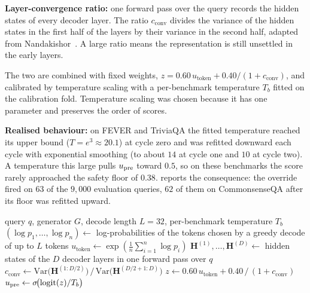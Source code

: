 \textbf{Layer-convergence ratio:} one forward pass over the query records the hidden states of every decoder layer. The ratio $c_{\text{conv}}$ divides the variance of the hidden states in the first half of the layers by their variance in the second half, adapted from Nandakishor~\cite{nandakishor2025routing}. A large ratio means the representation is still unsettled in the early layers.

The two are combined with fixed weights, $z = 0.60\,u_{\text{token}} + 0.40/(1+c_{\text{conv}})$, and calibrated by temperature scaling \cite{pmlr-v70-guo17a} with a per-benchmark temperature $T_b$ fitted on the calibration fold. Temperature scaling was chosen because it has one parameter and preserves the order of scores.

\textbf{Realised behaviour:} on FEVER and TriviaQA the fitted temperature reached its upper bound ($T = e^{3} \approx 20.1$) at cycle zero and was refitted downward each cycle with exponential smoothing (to about $14$ at cycle one and $10$ at cycle two). A temperature this large pulls $u_{\text{pre}}$ toward $0.5$, so on these benchmarks the score rarely approached the safety floor of $0.38$.  reports the consequence: the override fired on $63$ of the $9{,}000$ evaluation queries, $62$ of them on CommonsenseQA after its floor was refitted upward.

\begin{algorithm}[!htbp]
\caption[Pre-routing confidence (Stage~1).]{Pre-routing confidence (Stage~1).}
\label{alg:pre-routing}
\begin{algorithmic}[1]
\Require query $q$, generator $G$, decode length $L = 32$, per-benchmark temperature $T_{b}$
\State $(\log p_{1}, \dots, \log p_{n}) \gets$ log-probabilities of the tokens chosen by a greedy decode of up to $L$ tokens
\State $u_{\text{token}} \gets \exp\!\left(\tfrac{1}{n}\sum_{i=1}^{n} \log p_{i}\right)$ 
\State $\mathbf{H}^{(1)}, \dots, \mathbf{H}^{(D)} \gets$ hidden states of the $D$ decoder layers in one forward pass over $q$
\State $c_{\text{conv}} \gets \mathrm{Var}\big(\mathbf{H}^{(1:D/2)}\big) \,/\, \mathrm{Var}\big(\mathbf{H}^{(D/2+1:D)}\big)$ 
\State $z \gets 0.60\, u_{\text{token}} + 0.40\, /\,(1+c_{\text{conv}})$
\State \Return $u_{\text{pre}} \gets \sigma\!\big(\mathrm{logit}(z)/T_{b}\big)$ 
\end{algorithmic}
\end{algorithm}

